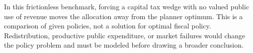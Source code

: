 In this frictionless benchmark, forcing a capital tax wedge with no valued
public use of revenue moves the allocation away from the planner optimum.
This is a comparison of given policies, not a solution for optimal fiscal
policy. Redistribution, productive public expenditure, or market failures
would change the policy problem and must be modeled before drawing a broader
conclusion.
